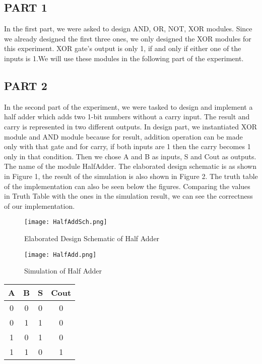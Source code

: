 \documentclass[pdftex,12pt,a4paper]{article}
\begin{document}
\subsection{PART 1}
In the first part, we were asked to design AND, OR, NOT, XOR modules. Since we already designed the first three ones, we only designed the XOR modules for this experiment. XOR gate's output is only 1, if and only if either one of the inputs is 1.We will use these modules in the following part of the experiment.

\subsection{PART 2}
In the second part of the experiment, we were tasked to design and implement a half adder which adds two 1-bit numbers without a carry input. The result and carry is represented in two different outputs. In design part, we instantiated XOR module and AND module because for result, addition operation can be made only with that gate and for carry, if both inputs are 1 then the carry becomes 1 only in that condition. Then we chose A and B as inputs, S and Cout as outputs. The name of the module HalfAdder. The elaborated design schematic is as shown in Figure 1, the result of the simulation is also shown in Figure 2. The truth table of the implementation can also be seen below the figures. Comparing the values in Truth Table with the ones in the simulation result, we can see the correctness of our implementation.

\begin{figure}[ht]
	\centering
	\texttt{[image: HalfAddSch.png]}
	\caption{Elaborated Design Schematic of Half Adder}
	\label{fig1}
\end{figure}

\begin{figure}[ht]
	\centering
	\texttt{[image: HalfAdd.png]}
	\caption{Simulation of Half Adder}
	\label{fig1}
\end{figure}

\begin{center}
 \begin{tabular}{|c|c|c|c|} 
 \hline
 A & B & S & Cout  \\ 
 \hline\hline
 0 & 0 & 0 & 0\\ 
 \hline
 0 & 1 & 1 & 0\\
 \hline
 1 & 0 & 1 & 0\\
 \hline
 1 & 1 & 0 & 1 \\
 \hline
\end{tabular}
\end{center}
\end{document}
